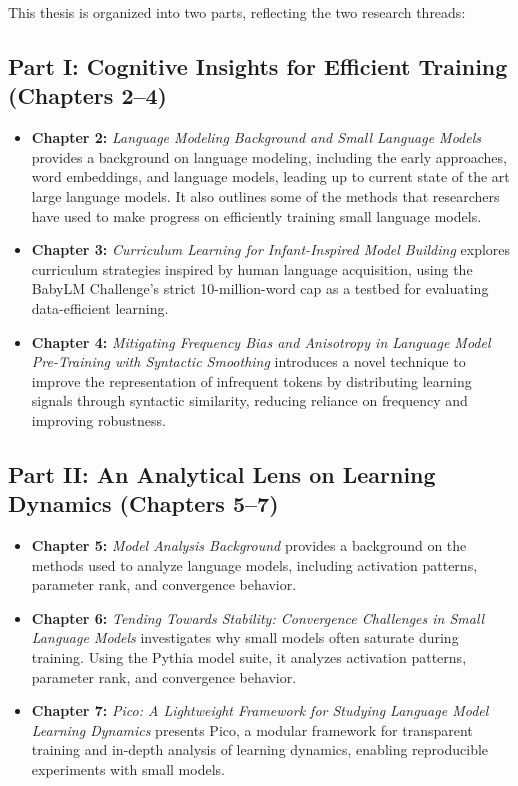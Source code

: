 This thesis is organized into two parts, reflecting the two research threads:

\subsection*{Part I: Cognitive Insights for Efficient Training (Chapters 2–4)}

\begin{itemize}

    \item \textbf{Chapter 2:} \emph{Language Modeling Background and Small Language Models} provides a background on language modeling, including the early approaches, word embeddings, and language models, leading up to current state of the art large language models. It also outlines some of the methods that researchers have used to make progress on efficiently training small language models.

    \item \textbf{Chapter 3:} \emph{Curriculum Learning for Infant-Inspired Model Building}  
    explores curriculum strategies inspired by human language acquisition, using the BabyLM Challenge's strict 10-million-word cap as a testbed for evaluating data-efficient learning.

    \item \textbf{Chapter 4:} \emph{Mitigating Frequency Bias and Anisotropy in Language Model Pre-Training with Syntactic Smoothing}  
    introduces a novel technique to improve the representation of infrequent tokens by distributing learning signals through syntactic similarity, reducing reliance on frequency and improving robustness.
\end{itemize}

\subsection*{Part II: An Analytical Lens on Learning Dynamics (Chapters 5–7)}

\begin{itemize}
    \item \textbf{Chapter 5:} \emph{Model Analysis Background} provides a background on the methods used to analyze language models, including activation patterns, parameter rank, and convergence behavior.

    \item \textbf{Chapter 6:} \emph{Tending Towards Stability: Convergence Challenges in Small Language Models}  
    investigates why small models often saturate during training. Using the Pythia model suite, it analyzes activation patterns, parameter rank, and convergence behavior.

    \item \textbf{Chapter 7:} \emph{Pico: A Lightweight Framework for Studying Language Model Learning Dynamics}  
    presents Pico, a modular framework for transparent training and in-depth analysis of learning dynamics, enabling reproducible experiments with small models.
\end{itemize}

